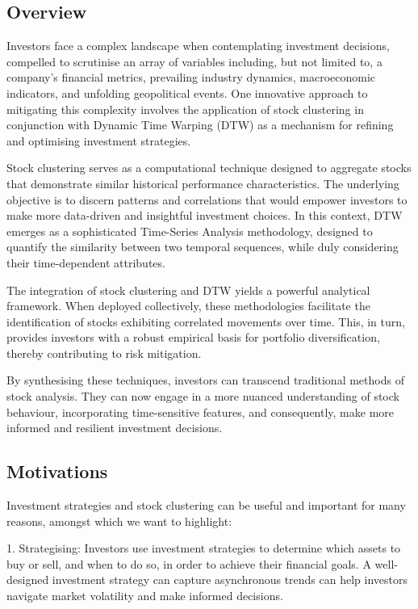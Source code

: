 \documentclass[11pt]{article}
\begin{document}
\subsection{Overview}

Investors face a complex landscape when contemplating investment decisions, compelled to scrutinise an array of variables including, but not limited to, a company’s financial metrics, prevailing industry dynamics, macroeconomic indicators, and unfolding geopolitical events. One innovative approach to mitigating this complexity involves the application of stock clustering in conjunction with Dynamic Time Warping (DTW) as a mechanism for refining and optimising investment strategies.

Stock clustering serves as a computational technique designed to aggregate stocks that demonstrate similar historical performance characteristics. The underlying objective is to discern patterns and correlations that would empower investors to make more data-driven and insightful investment choices. In this context, DTW emerges as a sophisticated Time-Series Analysis methodology, designed to quantify the similarity between two temporal sequences, while duly considering their time-dependent attributes.

The integration of stock clustering and DTW yields a powerful analytical framework. When deployed collectively, these methodologies facilitate the identification of stocks exhibiting correlated movements over time. This, in turn, provides investors with a robust empirical basis for portfolio diversification, thereby contributing to risk mitigation.

By synthesising these techniques, investors can transcend traditional methods of stock analysis. They can now engage in a more nuanced understanding of stock behaviour, incorporating time-sensitive features, and consequently, make more informed and resilient investment decisions. 

\subsection{Motivations}

Investment strategies and stock clustering can be useful and important for many reasons, amongst which we want to highlight: 

1. Strategising: Investors use investment strategies to determine which assets to buy or sell, and when to do so, in order to achieve their financial goals. A well-designed investment strategy can capture asynchronous trends can help investors navigate market volatility and make informed decisions. 
\end{document}
